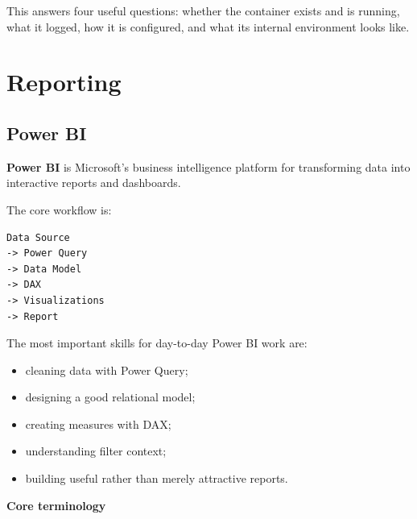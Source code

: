 \documentclass[11pt,letterpaper]{article}
\begin{document}
This answers four useful questions: whether the container exists and is
running, what it logged, how it is configured, and what its internal
environment looks like.



\section{Reporting}


\subsection{Power BI}

\textbf{Power BI} is Microsoft's business intelligence platform for
transforming data into interactive reports and dashboards.

The core workflow is:

\begin{lstlisting}
Data Source
-> Power Query
-> Data Model
-> DAX
-> Visualizations
-> Report
\end{lstlisting}

The most important skills for day-to-day Power BI work are:

\begin{itemize}[leftmargin=*]
    \item cleaning data with Power Query;
    \item designing a good relational model;
    \item creating measures with DAX;
    \item understanding filter context;
    \item building useful rather than merely attractive reports.
\end{itemize}



\textbf{Core terminology}
\end{document}
